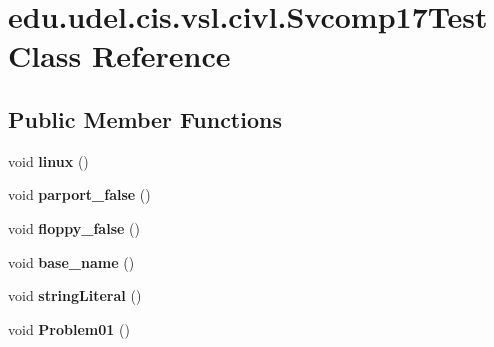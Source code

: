 \hypertarget{classedu_1_1udel_1_1cis_1_1vsl_1_1civl_1_1Svcomp17Test}{}\section{edu.\+udel.\+cis.\+vsl.\+civl.\+Svcomp17\+Test Class Reference}
\label{classedu_1_1udel_1_1cis_1_1vsl_1_1civl_1_1Svcomp17Test}
\subsection*{Public Member Functions}
\begin{DoxyCompactItemize}
\item 
\hypertarget{classedu_1_1udel_1_1cis_1_1vsl_1_1civl_1_1Svcomp17Test_a9f191d2f01625317790e5043359daf8f}{}void {\bfseries linux} ()\label{classedu_1_1udel_1_1cis_1_1vsl_1_1civl_1_1Svcomp17Test_a9f191d2f01625317790e5043359daf8f}

\item 
\hypertarget{classedu_1_1udel_1_1cis_1_1vsl_1_1civl_1_1Svcomp17Test_a13ca2bf6c90d0727173bed62216c22dd}{}void {\bfseries parport\+\_\+false} ()\label{classedu_1_1udel_1_1cis_1_1vsl_1_1civl_1_1Svcomp17Test_a13ca2bf6c90d0727173bed62216c22dd}

\item 
\hypertarget{classedu_1_1udel_1_1cis_1_1vsl_1_1civl_1_1Svcomp17Test_a251df2df149a9d6ddb415c99591b9cfc}{}void {\bfseries floppy\+\_\+false} ()\label{classedu_1_1udel_1_1cis_1_1vsl_1_1civl_1_1Svcomp17Test_a251df2df149a9d6ddb415c99591b9cfc}

\item 
\hypertarget{classedu_1_1udel_1_1cis_1_1vsl_1_1civl_1_1Svcomp17Test_a9e575e1b0d3215625c84b77e58408862}{}void {\bfseries base\+\_\+name} ()\label{classedu_1_1udel_1_1cis_1_1vsl_1_1civl_1_1Svcomp17Test_a9e575e1b0d3215625c84b77e58408862}

\item 
\hypertarget{classedu_1_1udel_1_1cis_1_1vsl_1_1civl_1_1Svcomp17Test_a82e16149d555d3ff3a254ac470445b09}{}void {\bfseries string\+Literal} ()\label{classedu_1_1udel_1_1cis_1_1vsl_1_1civl_1_1Svcomp17Test_a82e16149d555d3ff3a254ac470445b09}

\item 
\hypertarget{classedu_1_1udel_1_1cis_1_1vsl_1_1civl_1_1Svcomp17Test_ae410b0d7484fb2b9bec0aee60c20b745}{}void {\bfseries Problem01} ()\label{classedu_1_1udel_1_1cis_1_1vsl_1_1civl_1_1Svcomp17Test_ae410b0d7484fb2b9bec0aee60c20b745}


\end{DoxyCompactItemize}
